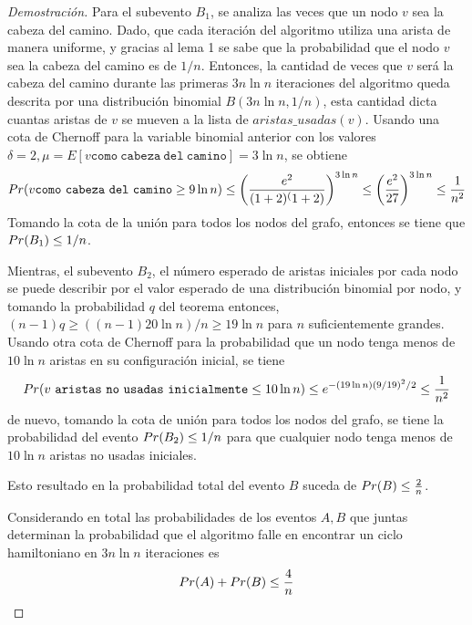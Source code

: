 \documentclass[12pt,letterpaper]{article}
\begin{document}
\begin{proof}[Demostración]
Para el subevento $B_1$, se analiza las veces que un nodo $v$ sea la cabeza del camino. Dado, que cada iteración del algoritmo utiliza una arista de manera uniforme, y gracias al lema 1 se sabe que la probabilidad que el nodo $v$ sea la cabeza del camino es de $1/n$. Entonces, la cantidad de veces que $v$ será la cabeza del camino durante las primeras $3n\ln n $ iteraciones del algoritmo queda descrita por una distribución binomial $B(3n\ln n, 1/n)$, esta cantidad dicta cuantas aristas de $v$ se mueven a la lista de $aristas\_usadas(v)$. 
Usando  una cota de Chernoff para la variable binomial anterior con los valores $\delta =2, \mu = E[v \mathtt{como\ cabeza\ del\ camino}] = 3\ln n$, se obtiene
\begin{equation*}
\mathnormal{Pr}(v \mathtt{como\ cabeza\ del\ camino} \geq 9\ln n)\leq \left(\frac{e^2}{(1+2)^(1+2)}\right)^{3\ln n} \leq \left(\frac{e^2}{27}\right)^{3\ln n}\leq \frac{1}{n^2}
\end{equation*}
Tomando la cota de la unión para todos los nodos del grafo, entonces se tiene que $\mathnormal{Pr}(B_1) \leq 1/n$.

Mientras, el subevento $B_2$, el número esperado de aristas iniciales por cada nodo se puede describir por el valor esperado de una distribución binomial por nodo, y tomando la probabilidad $q$ del teorema entonces, $(n-1)q \geq ((n-1) 20 \ln n) / n \geq 19\ln n$ para $n$ suficientemente grandes. Usando otra cota de Chernoff para la probabilidad que un nodo tenga menos de $10 \ln n$ aristas en su configuración inicial, se tiene
\begin{equation*}
\mathnormal{Pr}(v \mathtt{\ aristas\ no\ usadas\ inicialmente}\leq 10\ln n)\leq e^{-(19\ln n)(9/19)^2/2} \leq \frac{1}{n^2}
\end{equation*}
de nuevo, tomando la cota de unión para todos los nodos del grafo, se tiene la probabilidad del evento $\mathnormal{Pr}(B_2)\leq 1/n$ para que cualquier nodo tenga menos de $10\ln n $ aristas no usadas iniciales.

Esto resultado en la probabilidad total del evento $B$ suceda de $\mathnormal{Pr}(B) \leq \frac{2}{n}$.

Considerando en total las probabilidades de los eventos $A,B$ que juntas determinan la probabilidad que el algoritmo falle en encontrar un ciclo hamiltoniano en $3n\ln n$ iteraciones es
\begin{equation*}
\mathnormal{Pr}(A)+\mathnormal{Pr}(B) \leq \frac{4}{n}
\end{equation*}
\end{proof}
  
\end{document}
